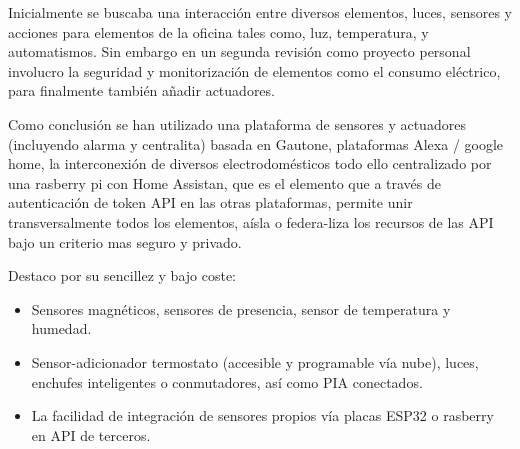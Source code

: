 Inicialmente se buscaba una interacción entre diversos elementos, luces, sensores y acciones para elementos de la oficina tales como, luz, temperatura, y automatismos. Sin embargo en un segunda revisión como proyecto personal involucro la seguridad y monitorización de elementos como el consumo eléctrico, para finalmente también añadir actuadores.

Como conclusión se han utilizado una plataforma de sensores y actuadores (incluyendo alarma y centralita) basada en Gautone, plataformas Alexa / google home, la interconexión de diversos electrodomésticos todo ello centralizado por una rasberry pi con Home Assistan, que es el elemento que a través de autenticación de token API en las otras plataformas, permite unir transversalmente todos los elementos, aísla o federa-liza los recursos de las API bajo un criterio mas seguro y privado.

Destaco por su sencillez y bajo coste:
\begin{itemize}
    \item Sensores magnéticos, sensores de presencia, sensor de temperatura y humedad.
    \item Sensor-adicionador termostato (accesible y programable vía nube), luces, enchufes inteligentes o conmutadores, así como PIA conectados.
    \item La facilidad de integración de sensores propios vía placas ESP32 o rasberry en API  de terceros.
\end{itemize}